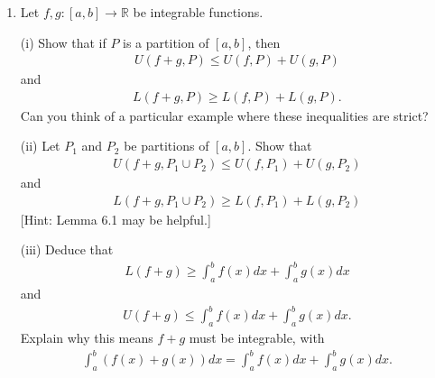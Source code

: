 \documentclass[letterpaper,10pt,english]{jupyterBook}
\begin{document}
\label{\detokenize{Problems:id69}}\begin{enumerate}
%
\setcounter{enumi}{68}
\item {} 
\sphinxAtStartPar
Let \(f,g:[a,b]\to\mathbb{R}\) be integrable functions.

\sphinxAtStartPar
(i) Show that if \(P\) is a partition of \([a,b]\), then
\begin{equation*}
\begin{split}
    U(f+g,P) \leq U(f,P)+U(g,P)
    \end{split}
\end{equation*}
\sphinxAtStartPar
and
\begin{equation*}
\begin{split}
    L(f+g,P) \geq L(f,P)+L(g,P).
    \end{split}
\end{equation*}
\sphinxAtStartPar
Can you think of a particular example where these inequalities are strict?

\sphinxAtStartPar
(ii) Let \(P_1\) and \(P_2\) be partitions of \([a,b]\). Show that
\begin{equation*}
\begin{split}
    U(f+g,P_1\cup P_2) \leq U(f,P_1) + U(g,P_2)
    \end{split}
\end{equation*}
\sphinxAtStartPar
and
\begin{equation*}
\begin{split}
    L(f+g,P_1\cup P_2) \geq L(f,P_1) + L(g,P_2)
    \end{split}
\end{equation*}
\sphinxAtStartPar
{[}Hint: Lemma 6.1 may be helpful.{]}

\sphinxAtStartPar
(iii) Deduce that
\begin{equation*}
\begin{split}
    L(f+g) \geq \int_a^bf(x)dx + \int_a^bg(x)dx
    \end{split}
\end{equation*}
\sphinxAtStartPar
and
\begin{equation*}
\begin{split}
    U(f+g) \leq \int_a^bf(x)dx + \int_a^bg(x)dx.
    \end{split}
\end{equation*}
\sphinxAtStartPar
Explain why this means \(f+g\) must be integrable, with
\begin{equation*}
\begin{split}
    \int_a^b(f(x)+g(x))dx = \int_a^bf(x)dx + \int_a^bg(x)dx.
    \end{split}
\end{equation*}
\end{enumerate}
\end{document}

